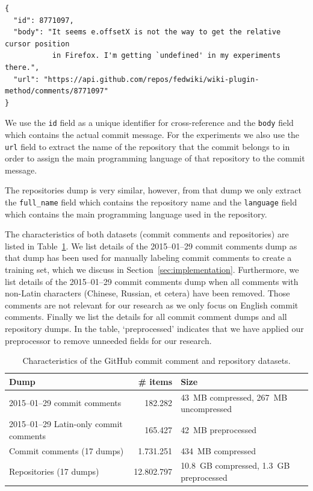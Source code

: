 \documentclass{article}
\begin{document}
\begin{verbatim}
{
  "id": 8771097,
  "body": "It seems e.offsetX is not the way to get the relative cursor position
           in Firefox. I'm getting `undefined' in my experiments there.",
  "url": "https://api.github.com/repos/fedwiki/wiki-plugin-method/comments/8771097"
}
\end{verbatim}

We use the {\tt id} field as a unique identifier for cross-reference and
the {\tt body} field which contains the actual commit message. For the
experiments we also use the {\tt url} field to extract the name of the
repository that the commit belongs to in order to assign the main
programming language of that repository to the commit message.

The repositories dump is very similar, however, from that dump we only
extract the {\tt full\_name} field which contains the repository name and
the {\tt language} field which contains the main programming language used
in the repository.

The characteristics of both datasets (commit comments and repositories) are
listed in Table~\ref{tab:dataset}. We list details of the 2015--01--29
commit comments dump as that dump has been used for manually labeling commit
comments to create a training set, which we discuss in
Section~\ref{sec:implementation}. Furthermore, we list details of the
2015--01--29 commit comments dump when all comments with non-Latin characters
(Chinese, Russian, et cetera) have been removed. Those comments are not
relevant for our research as we only focus on English commit comments. Finally
we list the details for all commit comment dumps and all repository dumps. In
the table, `preprocessed' indicates that we have applied our preprocessor to
remove unneeded fields for our research.

\begin{table}[h]
  \centering
  \begin{tabular}{l r l}
    \toprule
    \textbf{Dump}                           & \textbf{\# items} & \textbf{Size}                           \\
    \midrule
    2015--01--29 commit comments            & 182.282           & 43~MB compressed, 267~MB uncompressed   \\
    2015--01--29 Latin-only commit comments & 165.427           & 42~MB preprocessed                      \\
    Commit comments (17 dumps)              & 1.731.251         & 434~MB compressed                       \\
    Repositories (17 dumps)                 & 12.802.797        & 10.8~GB compressed, 1.3~GB preprocessed \\
    \bottomrule
  \end{tabular}
  \caption{Characteristics of the GitHub commit comment and repository datasets.}\label{tab:dataset}
\end{table}
\end{document}
